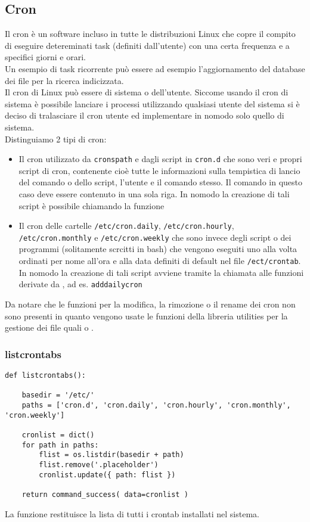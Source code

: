 \documentclass[11pt]{article}
\begin{document}
\subsection{Cron}
Il cron è un software incluso in tutte le distribuzioni Linux che copre il compito di eseguire
detereminati task (definiti dall'utente) con una certa frequenza e a specifici giorni e orari.\\
Un esempio di task ricorrente può essere ad esempio l'aggiornamento del database dei file per
la ricerca indicizzata.\\
Il cron di Linux può essere di sistema o dell'utente. Siccome usando il cron di sistema è possibile lanciare i processi
utilizzando qualsiasi utente del sistema si è deciso di tralasciare il cron utente ed implementare in nomodo
solo quello di sistema.\\
Distinguiamo 2 tipi di cron:
\begin{itemize}
	\item{Il cron utilizzato da \texttt{cronspath} e dagli script in \texttt{cron.d} che sono veri e propri
		script di cron, contenente cioè tutte le informazioni sulla tempistica di lancio del comando o
		dello script, l'utente e il comando stesso. Il comando in questo caso deve essere contenuto in una sola riga.
		In nomodo la creazione di tali script è possibile chiamando la funzione }
	\item{Il cron delle cartelle \texttt{/etc/cron.daily}, \texttt{/etc/cron.hourly}, \texttt{/etc/cron.monthly} e \texttt{/etc/cron.weekly}
		che sono invece degli script o dei programmi (solitamente scrcitti in bash) che vengono eseguiti uno
		alla volta ordinati per nome all'ora e alla data definiti di default nel file \texttt{/ect/crontab}.
		In nomodo la creazione di tali script avviene tramite la chiamata alle funzioni derivate da ,
		ad es. \texttt{adddailycron}}
\end{itemize}
Da notare che le funzioni per la modifica, la rimozione o il rename dei cron non sono presenti in quanto vengono usate le funzioni
della libreria utilities per la gestione dei file quali  o .

\subsubsection{listcrontabs}
\begin{lstlisting}
def listcrontabs():

    basedir = '/etc/'
    paths = ['cron.d', 'cron.daily', 'cron.hourly', 'cron.monthly', 'cron.weekly']

    cronlist = dict()
    for path in paths:
        flist = os.listdir(basedir + path)
        flist.remove('.placeholder') 
        cronlist.update({ path: flist })

    return command_success( data=cronlist )
\end{lstlisting}
La funzione restituisce la lista di tutti i crontab installati nel sistema.
\end{document}
